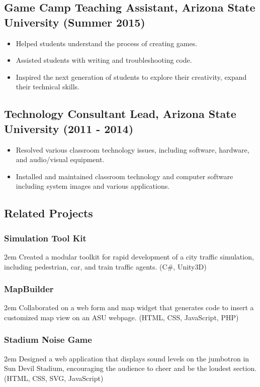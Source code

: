 \documentclass[letterpaper, 10pt]{article}
\begin{document}
\subsection{Game Camp Teaching Assistant, Arizona State University (Summer 2015)}
\begin{itemize}
\setlength\itemsep{-0.25em}
\item Helped students understand the process of creating games.
\item Assisted students with writing and troubleshooting code.
\item Inspired the next generation of students to explore their creativity, expand their technical skills.
\end{itemize}

\subsection{Technology Consultant Lead, Arizona State University (2011 \-- 2014)}
\begin{itemize}
\setlength\itemsep{-0.25em}
\item Resolved various classroom technology issues, including software, hardware, and audio/visual equipment.
\item Installed and maintained classroom technology and computer software including system images and various applications.
\end{itemize}

\subsection{Related Projects}

\subsubsection{Simulation Tool Kit}
\hangindent2em Created a modular toolkit for rapid development of a city traffic simulation, including pedestrian, car, and train traffic agents. (C\#, Unity3D)

\subsubsection{MapBuilder}
\hangindent2em Collaborated on a web form and map widget that generates code to insert a customized map view on an ASU webpage. (HTML, CSS, JavaScript, PHP)

\subsubsection{Stadium Noise Game}
\hangindent2em Designed a web application that displays sound levels on the jumbotron in Sun Devil Stadium, encouraging the audience to cheer and be the loudest section. (HTML, CSS, SVG, JavaScript)
\end{document}
